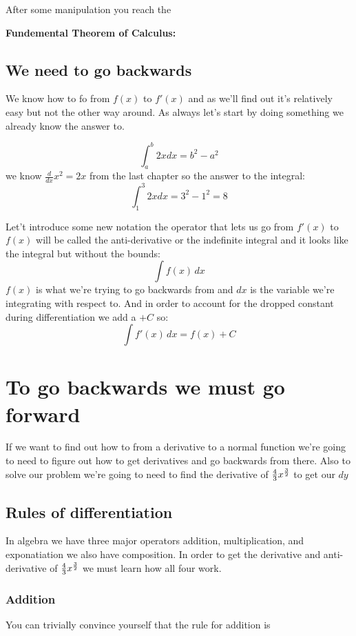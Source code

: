 \documentclass[12pt]{book}
\begin{document}
After some manipulation you reach the
\begin{center}
	\textbf{Fundemental Theorem of Calculus:}
\end{center}


\begin{center}
\end{center}

\section{We need to go backwards}
We know how to fo from $f(x)$ to $f'(x)$ and as we'll find out it's relatively easy but not the other way around. As always let's start by doing something we already know the answer to.

$$\int_{a}^{b} 2xdx = b^2-a^2$$
we know $\frac{d}{dx}x^2 = 2x$ from the last chapter so the answer to the integral:
$$\int_{1}^{3} 2xdx = 3^2-1^2 = 8$$

Let't introduce some new notation the operator that lets us go from $f'(x)$ to $f(x)$ will be called the anti-derivative or the indefinite integral and it looks like the integral but without the bounds:
\[
\int f(x) \, dx
\]
$f(x)$ is what we're trying to go backwards from and $dx$ is the variable we're integrating with respect to. And in order to account for the dropped constant during differentiation we add a $+C$ so:
\[
\int f'(x) \, dx = f(x) + C
\]

\chapter{To go backwards we must go forward}
If we want to find out how to from a derivative to a normal function we're going to need to figure out how to get derivatives and go backwards from there. Also to solve our problem we're going to need to find the derivative of $\frac{4}{3}x^{\frac{3}{2}}$ to get our $dy$
\section{Rules of differentiation}
 In algebra we have three major operators addition, multiplication, and exponatiation we also have composition. In order to get the derivative and anti-derivative of $\frac{4}{3}x^{\frac{3}{2}}$ we must learn how all four work.
\subsection{Addition}
You can trivially convince yourself that the rule for addition is
\begin{center}
\end{center}
\end{document}
